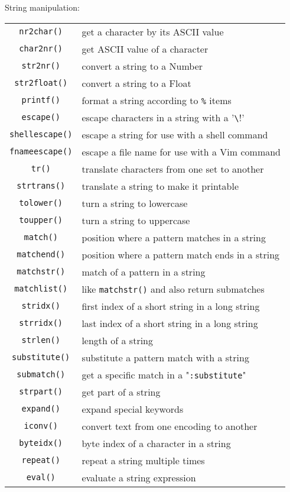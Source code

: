 String manipulation:
\label{string-functions}
\begin{center} \begin{tabular}{c l}
				\verb!nr2char()! & get a character by its ASCII value \\
				\verb!char2nr()! & get ASCII value of a character \\
				\verb!str2nr()! & convert a string to a Number \\
				\verb!str2float()! & convert a string to a Float \\
				\verb!printf()! & format a string according to \verb!%! items \\
				\verb!escape()! & escape characters in a string with a '\verb!\!' \\
				\verb!shellescape()! & escape a string for use with a shell command \\
				\verb!fnameescape()! & escape a file name for use with a Vim command \\
				\verb!tr()! & translate characters from one set to another \\
				\verb!strtrans()! & translate a string to make it printable \\
				\verb!tolower()! & turn a string to lowercase \\
				\verb!toupper()! & turn a string to uppercase \\
				\verb!match()! & position where a pattern matches in a string \\
				\verb!matchend()! & position where a pattern match ends in a string \\
				\verb!matchstr()! & match of a pattern in a string \\
				\verb!matchlist()! & like \verb!matchstr()! and also return submatches \\
				\verb!stridx()! & first index of a short string in a long string \\
				\verb!strridx()! & last index of a short string in a long string \\
				\verb!strlen()! & length of a string \\
				\verb!substitute()! & substitute a pattern match with a string \\
				\verb!submatch()! & get a specific match in a "\verb!:substitute!" \\
				\verb!strpart()! & get part of a string \\
				\verb!expand()! & expand special keywords \\
				\verb!iconv()! & convert text from one encoding to another \\
				\verb!byteidx()! & byte index of a character in a string \\
				\verb!repeat()! & repeat a string multiple times \\
				\verb!eval()! & evaluate a string expression \\
\end{tabular} \end{center}

